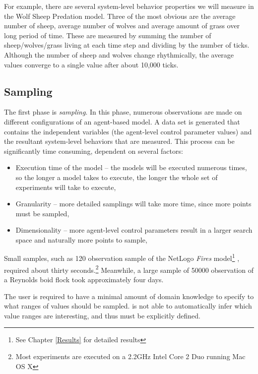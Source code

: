 For example, there are several system-level behavior properties we will measure in the Wolf Sheep Predation model.
Three of the most obvious are the average number of sheep, average number of wolves and average amount of grass over long period of time.
These are measured by summing the number of sheep/wolves/grass living at each time step and dividing by the number of ticks.
Although the number of sheep and wolves change rhythmically, the average values converge to a single value after about 10,000 ticks.

\subsection{Sampling}
The first phase is \textit{sampling}.
In this phase, numerous observations are made on different configurations of an agent-based model.
A data set is generated that contains the independent variables (the agent-level control parameter values) and the resultant system-level behaviors that are measured.
This process can be significantly time consuming, dependent on several factors:
\begin{itemize}
  \item Execution time of the model -- the models will be executed numerous times, so the longer a model takes to execute, the longer the whole set of experiments will take to execute,
  \item Granularity -- more detailed samplings will take more time, since more points must be sampled,
  \item Dimensionality -- more agent-level control parameters result in a larger search space and naturally more points to sample,
\end{itemize}
Small samples, such as 120 observation sample of the NetLogo \textit{Fires} model\footnote{See Chapter \ref{Results} for detailed results} \cite{fires} , required about thirty seconds.\footnote{Most experiments are executed on a 2.2GHz Intel Core 2 Duo running Mac OS X}
Meanwhile, a large sample of 50000 observation of a Reynolds boid flock \cite{reynolds1987} took approximately four days.

The user is required to have a minimal amount of domain knowledge to specify to \fw what ranges of values should be sampled.
\fw is not able to automatically infer which value ranges are interesting, and thus must be explicitly defined.

